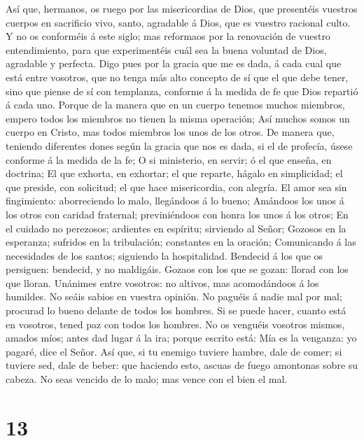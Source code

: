  Así que, hermanos, os ruego por las misericordias de
Dios, que presentéis vuestros cuerpos en sacrificio vivo, santo,
agradable á Dios, que es vuestro racional culto.  Y no os
conforméis á este siglo; mas reformaos por la renovación de vuestro
entendimiento, para que experimentéis cuál sea la buena voluntad de
Dios, agradable y perfecta.  Digo pues por la gracia que
me es dada, á cada cual que está entre vosotros, que no tenga más alto
concepto de sí que el que debe tener, sino que piense de sí con
templanza, conforme á la medida de fe que Dios repartió á cada uno.
 Porque de la manera que en un cuerpo tenemos muchos
miembros, empero todos los miembros no tienen la misma operación;
 Así muchos somos un cuerpo en Cristo, mas todos miembros
los unos de los otros.  De manera que, teniendo diferentes
dones según la gracia que nos es dada, si el de profecía, úsese conforme
á la medida de la fe;  O si ministerio, en servir; ó el
que enseña, en doctrina;  El que exhorta, en exhortar; el
que reparte, hágalo en simplicidad; el que preside, con solicitud; el
que hace misericordia, con alegría.  El amor sea sin
fingimiento: aborreciendo lo malo, llegándoos á lo bueno;
 Amándoos los unos á los otros con caridad fraternal;
previniéndoos con honra los unos á los otros;  En el
cuidado no perezosos; ardientes en espíritu; sirviendo al Señor;
 Gozosos en la esperanza; sufridos en la tribulación;
constantes en la oración;  Comunicando á las necesidades
de los santos; siguiendo la hospitalidad.  Bendecid á los
que os persiguen: bendecid, y no maldigáis.  Gozaos con
los que se gozan: llorad con los que lloran.  Unánimes
entre vosotros: no altivos, mas acomodándoos á los humildes. No seáis
sabios en vuestra opinión.  No paguéis á nadie mal por
mal; procurad lo bueno delante de todos los hombres.  Si
se puede hacer, cuanto está en vosotros, tened paz con todos los
hombres.  No os venguéis vosotros mismos, amados míos;
antes dad lugar á la ira; porque escrito está: Mía es la venganza: yo
pagaré, dice el Señor.  Así que, si tu enemigo tuviere
hambre, dale de comer; si tuviere sed, dale de beber: que haciendo esto,
ascuas de fuego amontonas sobre su cabeza.  No seas
vencido de lo malo; mas vence con el bien el mal.

\hypertarget{section-12}{%
\section{13}\label{section-12}}

